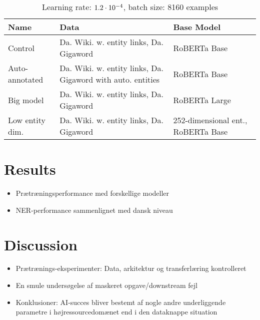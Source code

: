 \documentclass[12pt, fleqn]{article}
\begin{document}
\begin{table}[H]
    \centering
    \footnotesize
        \begin{tabular}{l|ll}
            Name                & Data & Base Model\\
            \hline
            Control             & Da. Wiki. w. entity links, Da. Gigaword & RoBERTa Base \\
            Auto-annotated      & Da. Wiki. w. entity links, Da. Gigaword with auto. entities & RoBERTa Base\\
            Big model           & Da. Wiki. w. entity links, Da. Gigaword & RoBERTa Large\\
            Low entity dim.     & Da. Wiki. w. entity links, Da. Gigaword & 252-dimensional ent., RoBERTa Base 
        \end{tabular}
    \caption{
        Learning rate: \(1.2\cdot10^{-4}\), batch size: 8160 examples
    }
    \label{tab:experiments}
\end{table}\noindent

\section{Results}%
\label{sec:Results}
\begin{itemize}
    \item Prætræningsperformance med forskellige modeller
    \item NER-performance sammenlignet med dansk niveau
\end{itemize}

\section{Discussion}%
\label{sec:Discussion}
\begin{itemize}
    \item Prætrænings-eksperimenter: Data, arkitektur og transferlæring kontrolleret
    \item En smule undersøgelse af maskeret opgave/downstream fejl
    \item Konklusioner: AI-succes bliver bestemt af nogle andre underliggende parametre i højressourcedomænet end i den dataknappe situation
\end{itemize}

\renewcommand*{\bibfont}{\normalfont\footnotesize}
\printbibliography[heading=bibintoc]

\appendix

\end{document}
